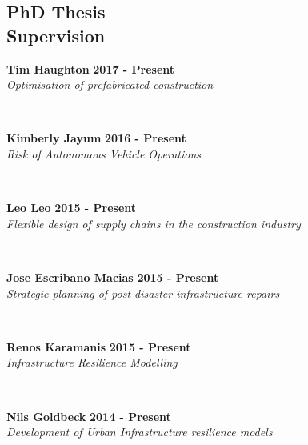 \documentclass[margin]{res}
\newcommand\tab[1][1cm]{\hspace*{#1}}
\begin{document}
\begin{resume}
\section{\sc PhD Thesis\\ Supervision}
	\vspace{0.03in}
	\begin{minipage}{\textwidth}
	{\bf Tim Haughton} \hfill {\bf 2017 - Present} \\
	\tab[0.2in] \textit{Optimisation of prefabricated construction}
	\end{minipage}
	\\
	\vspace{0.03in}
	\begin{minipage}{\textwidth}
	{\bf Kimberly Jayum} \hfill {\bf 2016 - Present} \\
	\tab[0.2in] \textit{Risk of Autonomous Vehicle Operations}
	\end{minipage}
	\\
	\vspace{0.03in}
	\begin{minipage}{\textwidth}
	{\bf Leo Leo} \hfill {\bf 2015 - Present} \\
	\tab[0.2in] \textit{Flexible design of supply chains in the construction industry}
	\end{minipage}
	\\
	\vspace{0.03in}
	\begin{minipage}{\textwidth}
	{\bf Jose Escribano Macias} \hfill {\bf 2015 - Present} \\
	\tab[0.2in] \textit{Strategic planning of post-disaster infrastructure repairs}
	\end{minipage}
	\\
	\vspace{0.03in}
	\begin{minipage}{\textwidth}
	{\bf Renos Karamanis} \hfill {\bf 2015 - Present} \\
	\tab[0.2in] \textit{Infrastructure Resilience Modelling}
	\end{minipage}
	\\
	\vspace{0.03in}
	\begin{minipage}{\textwidth}
	{\bf Nils Goldbeck} \hfill {\bf 2014 - Present} \\
	\tab[0.2in] \textit{Development of Urban Infrastructure resilience models}
	\end{minipage}
	\\
	\vspace{0.03in}

\end{resume}
\end{document}

